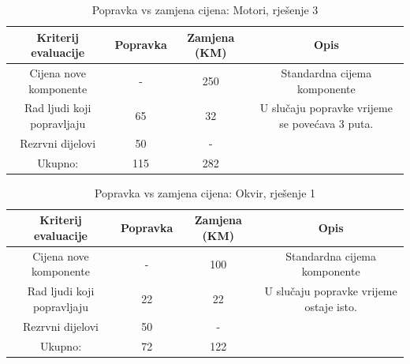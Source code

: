\documentclass[12pt]{article}
\begin{document}
\begin{landscape}
\vspace*{\fill}
\begin{table}[htbp]
\footnotesize
  \centering
  \caption{Popravka vs zamjena cijena: Motori, rješenje 3}
    \begin{tabular}{cccc}
    \toprule
    Kriterij evaluacije & Popravka & Zamjena (KM) & Opis \\
    \midrule
     Cijena nove komponente & -     & 250   & \multicolumn{1}{p{24.285em}}{Standardna \newline{}cijema\newline{} komponente} \\
    \midrule
    Rad ljudi koji popravljaju & 65    & 32    & \multicolumn{1}{p{24.285em}}{ U slučaju popravke vrijeme se povećava 3 puta. } \\
    \midrule
    Rezrvni dijelovi & 50    & -     &  \\
    \midrule
    Ukupno: & 115   & 282   &  \\
    \bottomrule
    \end{tabular}%
  \label{tab:popravka5}%
\end{table}%

\begin{table}[htbp]
  \centering
  \footnotesize
  \caption{Popravka vs zamjena cijena: Okvir, rješenje 1}
    \begin{tabular}{cccc}
    \toprule
    Kriterij evaluacije & Popravka & Zamjena (KM) & Opis \\
    \midrule
     Cijena nove komponente & -     & 100   & \multicolumn{1}{p{19.57em}}{Standardna \newline{}cijema\newline{} komponente} \\
    \midrule
    Rad ljudi koji popravljaju & 22    & 22    & \multicolumn{1}{p{19.57em}}{ U slučaju popravke vrijeme ostaje isto. } \\
    \midrule
    Rezrvni dijelovi & 50    & -     &  \\
    \midrule
    Ukupno: & 72    & 122   &  \\
    \bottomrule
    \end{tabular}%
  \label{tab:popravka6}%
\end{table}%
\vspace*{\fill}
\end{landscape}
\end{document}
